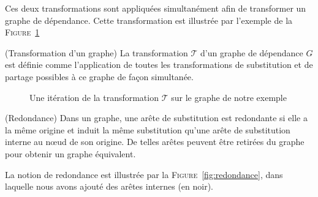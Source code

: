Ces deux transformations sont appliquées simultanément afin de
transformer un graphe de dépendance. Cette transformation est illustrée
par l'exemple de la \textsc{Figure}~\ref{fig:etape_de_monomorphisation}

\begin{mydef} (Transformation d'un graphe)
La transformation $\mathcal{T}$ d'un graphe de dépendance $G$ est définie comme l'application de toutes les transformations de substitution et de partage possibles à ce graphe de façon simultanée.
\end{mydef}

\begin{figure}[h!]
\begin{center}
\end{center}
\caption{Une itération de la transformation $\mathcal{T}$ sur le graphe de notre exemple}
\label{fig:etape_de_monomorphisation}
\end{figure}


\begin{mydef} (Redondance) Dans un graphe, une arête de substitution est
  redondante si elle a la m\^eme origine et induit la m\^eme
  substitution qu'une arête de substitution interne au nœud de son
  origine. De telles arêtes peuvent être retirées du graphe pour obtenir
  un graphe équivalent.
\end{mydef}

La notion de redondance est illustrée par la \textsc{Figure}~\ref{fig:redondance}, dans laquelle nous avons ajouté des arêtes internes (en noir).

